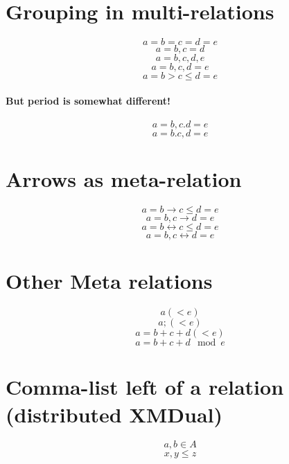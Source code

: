\documentclass{article}
\begin{document}
\section{Grouping in multi-relations}
\[ a=b=c=d=e \]
\[ a=b,c=d   \]
\[ a=b,c,d,e \]
\[ a=b,c,d=e \]
\[ a=b>c\le d=e \]

\paragraph{But period is somewhat different!}
\[ a=b,c.d=e \]
\[ a=b.c,d=e \]


\section{Arrows as meta-relation}
\[ a=b \rightarrow c\le d=e \]
\[ a=b,c \rightarrow d=e \]
\[ a=b \leftrightarrow c\le d=e \]
\[ a=b,c \leftrightarrow d=e \]

\section{Other Meta relations}
\[ a (< e) \]
\[ a; (< e) \]
\[ a = b + c + d (< e) \]
\[ a = b + c + d \mod e \]

\section{Comma-list left of a relation (distributed XMDual)}
\[ a,b \in A \]
\[ x,y \le z \]
\end{document}
